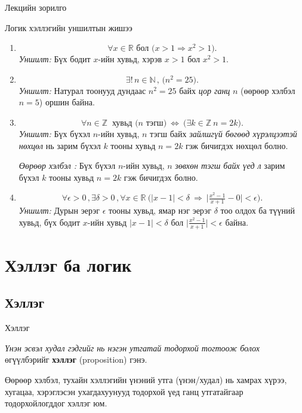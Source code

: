 \begin{frame}[allowframebreaks]{Лекцийн зорилго}
\begin{example} Логик хэллэгийн уншилтын жишээ
  \begin{enumerate} 
      \item
\[
\forall x\in\mathbb{R} \text{ бол } \big( x>1  \Rightarrow  x^2>1 \big).
\]
\textit{Уншилт:} Бүх бодит \(x\)-ийн хувьд, хэрэв \(x>1\) бол \(x^2>1\).\par\medskip
      \item \[
\exists!\,n\in\mathbb{N}\, , \,\big( n^2=25\big).
\]
\textit{Уншилт:} Натурал тоонууд дундаас \(n^2=25\) байх \emph{цор ганц} \(n\) (өөрөөр хэлбэл \(n=5\)) оршин байна.\par\medskip
      \item\[
\forall n\in\mathbb{Z}\ \text{ хувьд } \big(n \text{ тэгш}\big)\ \Leftrightarrow\ \big(\exists k\in\mathbb{Z}\ n=2k\big).
\]
\textit{Уншилт:} Бүх бүхэл \(n\)-ийн хувьд, \(n\) тэгш байх \emph{зайлшгүй бөгөөд хүрэлцээтэй нөхцөл} нь зарим бүхэл \(k\) тооны хувьд \(n=2k\) гэж бичигдэх нөхцөл болно.\par\medskip
\textit{Өөрөөр хэлбэл :} Бүх бүхэл \(n\)-ийн хувьд, \(n\)  \emph{зөвхөн тэгш байх үед л} зарим бүхэл \(k\) тооны хувьд \(n=2k\) гэж бичигдэх болно.\par\medskip
      \item \[
\forall \epsilon>0\, ,  \exists \delta>0\,  , \forall x\in\mathbb{R}\ 
\Big(|x-1|<\delta\ \Rightarrow\ \big|\tfrac{x^2-1}{x+1}-0\big|<\epsilon\Big).
\]
\textit{Уншилт:} Дурын эерэг \(\epsilon\) тооны хувьд, ямар нэг эерэг \(\delta\) тоо олдох ба түүний хувьд, бүх бодит \(x\)-ийн хувьд \(|x-1|<\delta\) бол
\(\big|\frac{x^2-1}{x+1}\big|<\epsilon\) байна.\par\medskip
  \end{enumerate}  
\end{example}
\end{frame}

\section{Хэллэг ба логик}
\subsection{Хэллэг}
\begin{frame}[allowframebreaks]{Хэллэг}
\begin{definition} \emph{Үнэн эсвэл худал гэдгийг нь нэгэн утгатай тодорхой тогтоож болох} өгүүлбэрийг \textbf{хэллэг} (proposition) гэнэ.
\end{definition}
 Өөрөөр хэлбэл, тухайн хэллэгийн үнэний утга (үнэн/худал) нь хамрах хүрээ, хугацаа, хэрэглэсэн ухагдахуунууд тодорхой үед ганц утгатайгаар тодорхойлогддог хэллэг юм.
\end{frame}

